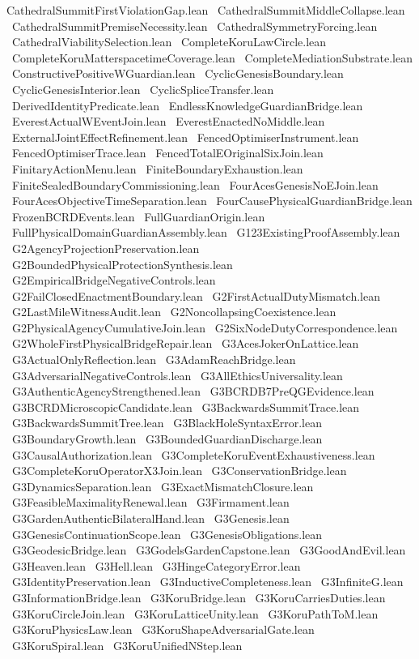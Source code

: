 CathedralSummitFirstViolationGap.lean \
CathedralSummitMiddleCollapse.lean \
CathedralSummitPremiseNecessity.lean \
CathedralSymmetryForcing.lean \
CathedralViabilitySelection.lean \
CompleteKoruLawCircle.lean \
CompleteKoruMatterspacetimeCoverage.lean \
CompleteMediationSubstrate.lean \
ConstructivePositiveWGuardian.lean \
CyclicGenesisBoundary.lean \
CyclicGenesisInterior.lean \
CyclicSpliceTransfer.lean \
DerivedIdentityPredicate.lean \
EndlessKnowledgeGuardianBridge.lean \
EverestActualWEventJoin.lean \
EverestEnactedNoMiddle.lean \
ExternalJointEffectRefinement.lean \
FencedOptimiserInstrument.lean \
FencedOptimiserTrace.lean \
FencedTotalEOriginalSixJoin.lean \
FinitaryActionMenu.lean \
FiniteBoundaryExhaustion.lean \
FiniteSealedBoundaryCommissioning.lean \
FourAcesGenesisNoEJoin.lean \
FourAcesObjectiveTimeSeparation.lean \
FourCausePhysicalGuardianBridge.lean \
FrozenBCRDEvents.lean \
FullGuardianOrigin.lean \
FullPhysicalDomainGuardianAssembly.lean \
G123ExistingProofAssembly.lean \
G2AgencyProjectionPreservation.lean \
G2BoundedPhysicalProtectionSynthesis.lean \
G2EmpiricalBridgeNegativeControls.lean \
G2FailClosedEnactmentBoundary.lean \
G2FirstActualDutyMismatch.lean \
G2LastMileWitnessAudit.lean \
G2NoncollapsingCoexistence.lean \
G2PhysicalAgencyCumulativeJoin.lean \
G2SixNodeDutyCorrespondence.lean \
G2WholeFirstPhysicalBridgeRepair.lean \
G3AcesJokerOnLattice.lean \
G3ActualOnlyReflection.lean \
G3AdamReachBridge.lean \
G3AdversarialNegativeControls.lean \
G3AllEthicsUniversality.lean \
G3AuthenticAgencyStrengthened.lean \
G3BCRDB7PreQGEvidence.lean \
G3BCRDMicroscopicCandidate.lean \
G3BackwardsSummitTrace.lean \
G3BackwardsSummitTree.lean \
G3BlackHoleSyntaxError.lean \
G3BoundaryGrowth.lean \
G3BoundedGuardianDischarge.lean \
G3CausalAuthorization.lean \
G3CompleteKoruEventExhaustiveness.lean \
G3CompleteKoruOperatorX3Join.lean \
G3ConservationBridge.lean \
G3DynamicsSeparation.lean \
G3ExactMismatchClosure.lean \
G3FeasibleMaximalityRenewal.lean \
G3Firmament.lean \
G3GardenAuthenticBilateralHand.lean \
G3Genesis.lean \
G3GenesisContinuationScope.lean \
G3GenesisObligations.lean \
G3GeodesicBridge.lean \
G3GodelsGardenCapstone.lean \
G3GoodAndEvil.lean \
G3Heaven.lean \
G3Hell.lean \
G3HingeCategoryError.lean \
G3IdentityPreservation.lean \
G3InductiveCompleteness.lean \
G3InfiniteG.lean \
G3InformationBridge.lean \
G3KoruBridge.lean \
G3KoruCarriesDuties.lean \
G3KoruCircleJoin.lean \
G3KoruLatticeUnity.lean \
G3KoruPathToM.lean \
G3KoruPhysicsLaw.lean \
G3KoruShapeAdversarialGate.lean \
G3KoruSpiral.lean \
G3KoruUnifiedNStep.lean \
